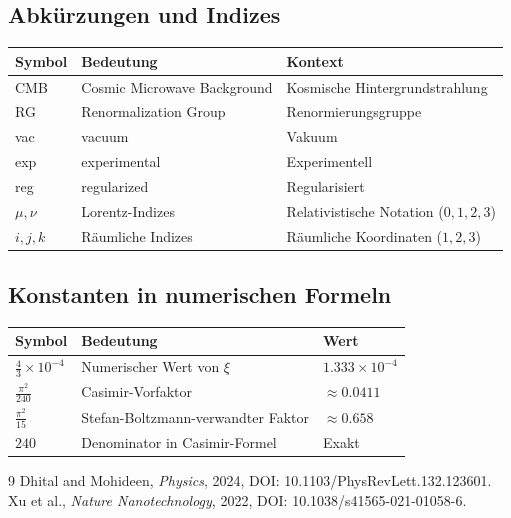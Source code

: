 	\subsection{Abkürzungen und Indizes}
	\begin{longtable}{>{\raggedright\arraybackslash}p{1.5cm} >{\raggedright\arraybackslash}p{6.5cm} >{\raggedright\arraybackslash}p{2.5cm}}
		\toprule
		\textbf{Symbol} & \textbf{Bedeutung} & \textbf{Kontext} \\
		\midrule
		CMB & Cosmic Microwave Background & Kosmische Hintergrundstrahlung \\
		RG & Renormalization Group & Renormierungsgruppe \\
		vac & vacuum & Vakuum \\
		exp & experimental & Experimentell \\
		reg & regularized & Regularisiert \\
		$\mu, \nu$ & Lorentz-Indizes & Relativistische Notation ($0,1,2,3$) \\
		$i, j, k$ & Räumliche Indizes & Räumliche Koordinaten ($1,2,3$) \\
		\bottomrule
	\end{longtable}
	
	\subsection{Konstanten in numerischen Formeln}
	\begin{longtable}{>{\raggedright\arraybackslash}p{1.5cm} >{\raggedright\arraybackslash}p{6.5cm} >{\raggedright\arraybackslash}p{2.5cm}}
		\toprule
		\textbf{Symbol} & \textbf{Bedeutung} & \textbf{Wert} \\
		\midrule
		$\frac{4}{3} \times 10^{-4}$ & Numerischer Wert von $\xi$ & $1.333 \times 10^{-4}$ \\
		$\frac{\pi^2}{240}$ & Casimir-Vorfaktor & $\approx 0.0411$ \\
		$\frac{\pi^2}{15}$ & Stefan-Boltzmann-verwandter Faktor & $\approx 0.658$ \\
		$240$ & Denominator in Casimir-Formel & Exakt \\
		\bottomrule
	\end{longtable}
		\begin{thebibliography}{9}
		Dhital and Mohideen, \emph{Physics}, 2024, DOI: 10.1103/PhysRevLett.132.123601.
		Xu et al., \emph{Nature Nanotechnology}, 2022, DOI: 10.1038/s41565-021-01058-6.
	\end{thebibliography}